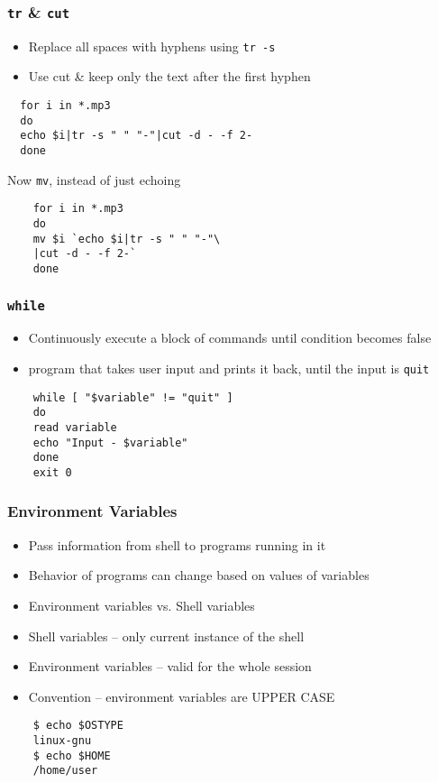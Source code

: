 \documentclass[12pt,compress]{beamer}
\begin{document}
\begin{frame}[fragile]
  \frametitle{\texttt{tr} \& \texttt{cut}}
  \begin{itemize}
  \item Replace all spaces with hyphens using \texttt{tr -s}
  \item Use cut \& keep only the text after the first hyphen
  \end{itemize}
  \begin{lstlisting}
  for i in *.mp3
  do 
  echo $i|tr -s " " "-"|cut -d - -f 2-
  done
  \end{lstlisting} %
  Now \texttt{mv}, instead of just echoing
  \begin{lstlisting}
    for i in *.mp3
    do 
    mv $i `echo $i|tr -s " " "-"\
    |cut -d - -f 2-`
    done
  \end{lstlisting} %
\end{frame}


\begin{frame}[fragile]
  \frametitle{\texttt{while}}
  \begin{itemize}
  \item Continuously execute a block of commands until condition
    becomes false
  \end{itemize}

  \begin{itemize}
  \item program that takes user input and prints it back, until the
    input is \texttt{quit}
  \end{itemize}

  \begin{lstlisting}
    while [ "$variable" != "quit" ]
    do
    read variable
    echo "Input - $variable"
    done
    exit 0
  \end{lstlisting} %
\end{frame}

\begin{frame}[fragile]
  \frametitle{Environment Variables}
  \begin{itemize}
  \item Pass information from shell to programs running in it
  \item Behavior of programs can change based on values of variables
  \item Environment variables vs. Shell variables
  \item Shell variables -- only current instance of the shell
  \item Environment variables -- valid for the whole session
  \item Convention -- environment variables are UPPER CASE
  \end{itemize}
  \begin{lstlisting}
    $ echo $OSTYPE 
    linux-gnu
    $ echo $HOME
    /home/user
  \end{lstlisting} %
\end{frame}
\end{document}

